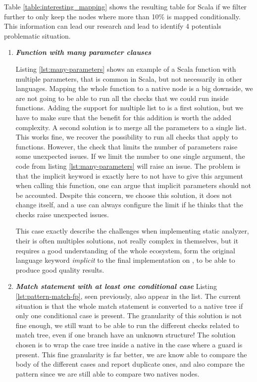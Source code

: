 Table \ref{table:interesting_mapping} shows the resulting table for Scala if we filter further to only keep the nodes where more than 10\% is mapped conditionally. 
This information can lead our research and lead to identify 4 potentials problematic situation.

\begin{enumerate}
	\item \textbf{\textit{Function with many parameter clauses}} \newline 
	
	
	Listing \ref{lst:many-parameters} shows an example of a Scala function with multiple parameters, that is common in Scala, but not necessarily in other languages. 
	Mapping the whole function to a native node is a big downside, we are not going to be able to run all the checks that we could run inside functions.
	Adding the support for multiple list to \slang{} is a first solution, but we have to make sure that the benefit for this addition is worth the added complexity.
	A second solution is to merge all the parameters to a single list.
	This works fine, we recover the possibility to run all checks that apply to functions.
	However, the check that limits the number of parameters raise some unexpected issues.
	If we limit the number to one single argument, the code from listing \ref{lst:many-parameters} will raise an issue.
	The problem is that the implicit keyword is exactly here to not have to give this argument when calling this function, one can argue that implicit parameters should not be accounted.
	Despite this concern, we choose this solution, it does not change \slang{} itself, and a use can always configure the limit if he thinks that the checks raise unexpected issues.
	
	This case exactly describe the challenges when implementing static analyzer, their is often multiples solutions, not really complex in themselves, but it requires a good understanding of the whole ecosystem, form the original language keyword \emph{implicit} to the final implementation on \slang{}, to be able to produce good quality results.
	
	\item \textbf{\textit{Match statement with at least one conditional case}} \newline 
	Listing \ref{lst:pattern-match-fp}, seen previously, also appear in the list. The current situation is that the whole match statement is converted to a native tree if only one conditional case is present. 
	The granularity of this solution is not fine enough, we still want to be able to run the different checks related to match tree, even if one branch have an unknown structure!
	The solution chosen is to wrap the case tree inside a native in the case where a guard is present.
	This fine granularity is far better, we are know able to compare the body of the different cases and report duplicate ones, and also compare the pattern since we are still able to compare two natives nodes.
	

\end{enumerate}
